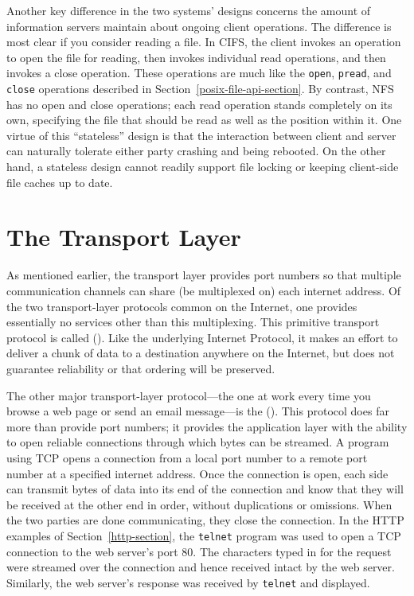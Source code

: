 Another key difference in the two systems' designs concerns the amount
of information servers maintain about ongoing client operations.  The
difference is most clear if you consider reading a file.  In CIFS, the
client invokes an operation to open the file for reading, then invokes
individual read operations, and then invokes a close operation.  These
operations are much like the \verb|open|, \verb|pread|, and
\verb|close| operations described in
Section~\ref{posix-file-api-section}.  By contrast, NFS has no open
and close operations; each read operation stands completely on its
own, specifying the file that should be read as well as the position
within it.  One virtue of this ``stateless'' design is that the
interaction between client and server can naturally tolerate either
party crashing and being rebooted.  On the other hand, a stateless
design cannot readily support file locking or keeping client-side
file caches up to date.

\section{The Transport Layer}\label{transport-layer-section}

As mentioned earlier, the transport layer provides port numbers so that
multiple communication channels can share (be multiplexed on) each
internet address.  Of the two transport-layer protocols common on the
Internet, one provides essentially no services other than this
multiplexing.  This primitive transport protocol is called
 ().  Like the underlying
Internet Protocol, it makes an effort to deliver a chunk of data to a
destination anywhere on the Internet, but does not guarantee
reliability or that ordering will be preserved.

The other major transport-layer protocol---the one at work every time
you browse a web page or send an email message---is the
 ().  This protocol does far more
than provide port numbers; it provides the application layer with the
ability to open reliable connections through which bytes can be
streamed.  A program using TCP opens a connection from a local port
number to a remote port number at a specified internet address.  Once
the connection is open, each side can transmit bytes of data into its
end of the connection and know that they will be received at the
other end in order, without duplications or omissions.  When the two
parties are done communicating, they close the connection.  In the
HTTP examples of Section~\ref{http-section}, the \verb|telnet| program
was used to open a TCP connection to the web server's port 80.  The
characters typed in for the request were streamed over the connection
and hence received intact by the web server.  Similarly, the web
server's response was received by \verb|telnet| and displayed.

